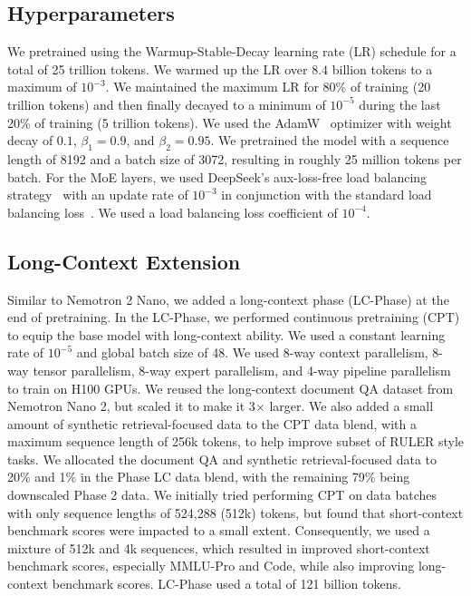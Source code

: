 \subsection{Hyperparameters}\label{sec:pre-train-hyperparams}
We pretrained \ourbasemodel using the Warmup-Stable-Decay learning rate (LR) schedule for a total of 25 trillion tokens. We warmed up the LR over $8.4$ billion tokens to a maximum of $10^{-3}$. We maintained the maximum LR for 80\% of training (20 trillion tokens) and then finally decayed to a minimum of $10^{-5}$ during the last 20\% of training (5 trillion tokens). We used the AdamW~\citep{loshchilov2017decoupled} optimizer with weight decay of $0.1$, $\beta_1=0.9$, and $\beta_2=0.95$. We pretrained the model with a sequence length of 8192 and a batch size of 3072, resulting in roughly 25 million tokens per batch. For the MoE layers, we used DeepSeek's aux-loss-free load balancing strategy~\citep{wang2024auxiliary,deepseekai2025deepseekv3technicalreport} with an update rate of $10^{-3}$ in conjunction with the standard load balancing loss~\citep{lepikhin2020gshard}. We used a load balancing loss coefficient of $10^{-4}$.


\subsection{Long-Context Extension}\label{sec:pre-train-long-context}

Similar to Nemotron 2 Nano, we added a long-context phase (LC-Phase) at the end of pretraining. In the LC-Phase, we performed continuous pretraining (CPT) to equip the base model with long-context ability. We used a constant learning rate of $10^{-5}$ and global batch size of 48. We used 8-way context parallelism, 8-way tensor parallelism, 8-way expert parallelism, and 4-way pipeline parallelism to train on H100 GPUs. We reused the long-context document QA dataset from Nemotron Nano 2, but scaled it to make it 3$\times$ larger. We also added a small amount of synthetic retrieval-focused data to the CPT data blend, with a maximum sequence length of 256k tokens, to help improve subset of RULER style tasks. We allocated the document QA and synthetic retrieval-focused data to 20\% and 1\% in the Phase LC data blend, with the remaining 79\% being downscaled Phase 2 data. We initially tried performing CPT on data batches with only sequence lengths of 524,288 (512k) tokens, but found that short-context benchmark scores were impacted to a small extent. Consequently, we used a mixture of 512k and 4k sequences, which resulted in improved short-context benchmark scores, especially MMLU-Pro and Code, while also improving long-context benchmark scores. LC-Phase used a total of 121 billion tokens.


